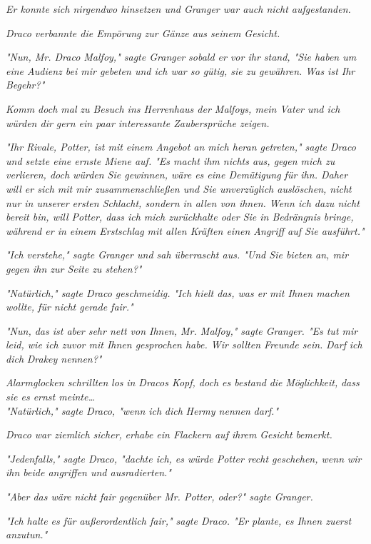 {\emph{Er konnte sich nirgendwo hinsetzen und Granger war auch nicht aufgestanden.}

\emph{Draco verbannte die Empörung zur Gänze aus seinem Gesicht.}

\emph{"Nun, Mr. Draco Malfoy," sagte Granger sobald er vor ihr stand, "Sie haben um eine Audienz bei mir gebeten und ich war so gütig, sie zu gewähren. Was ist Ihr Begehr?"}

\emph{\emph{Komm doch m}\emph{al}} \emph{\emph{zu Besuch ins Herrenhaus der Malfoys, mein Vater und ich würden dir gern ein paar interessante Zaubersprüche zeigen.}}

\emph{"Ihr Rivale, Potter, ist mit einem Angebot an mich heran getreten," sagte Draco und setzte eine ernste Miene auf. "Es macht ihm nichts aus, gegen mich zu verlieren, doch würden Sie gewinnen, wäre es eine Demütigung für ihn. Daher will er sich mit mir zusammenschließen und Sie unverzüglich auslöschen, nicht nur in unserer ersten Schlacht, sondern in allen von ihnen. Wenn ich dazu nicht bereit bin, will Potter, dass ich mich zurückhalte oder Sie in Bedrängnis bringe, während er in einem Erstschlag mit allen Kräften einen Angriff auf Sie ausführt."}

\emph{"Ich verstehe," sagte Granger und sah überrascht aus. "Und Sie bieten an, mir gegen ihn zur Seite zu stehen?"}

\emph{"Natürlich," sagte Draco geschmeidig. "Ich hielt das, was er mit Ihnen machen wollte, für nicht gerade fair."}

\emph{"Nun, das ist aber sehr nett von Ihnen, Mr. Malfoy," sagte Granger. "Es tut mir leid, wie ich zuvor mit Ihnen gesprochen habe. Wir sollten Freunde sein.} \emph{Darf} \emph{ich} \emph{dich} \emph{Drakey nennen?"}

\emph{Alarmglocken schrillten} \emph{los} \emph{in Dracos Kopf, doch es bestand} \emph{die} \emph{\emph{Möglichkeit,}} \emph{dass sie es ernst meinte…}\\ \emph{"Natürlich," sagte Draco, "wenn ich} \emph{dich} \emph{Hermy nennen} \emph{darf."}

\emph{Draco war ziemlich sicher,} \emph{erhabe ein Flackern auf ihrem} \emph{Gesicht} \emph{bemerkt.}

\emph{"Jedenfalls," sagte Draco, "dachte ich, es würde Potter recht geschehen, wenn wir ihn beide angriffen und ausradierten."}

\emph{"Aber das wäre nicht fair gegenüber Mr. Potter, oder?" sagte Granger.}

\emph{"Ich halte es für} \emph{außerordentlich fair," sagte Draco. "Er plante, es Ihnen zuerst anzutun."}

}
